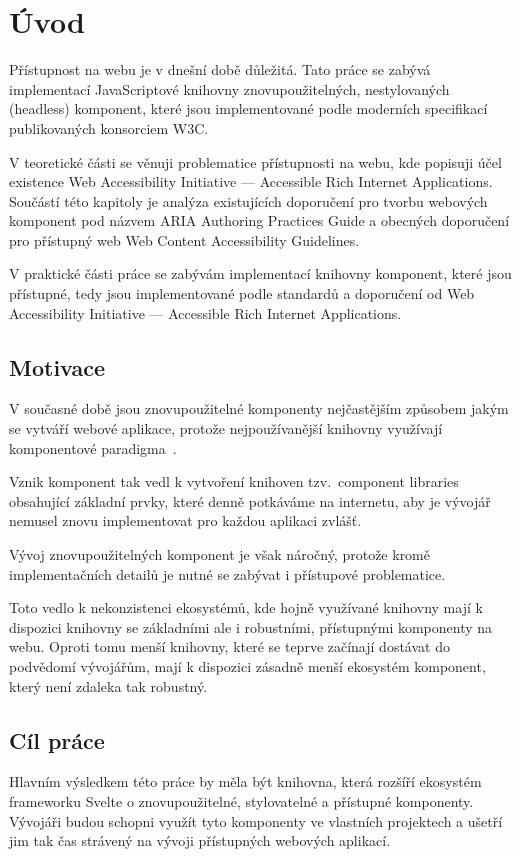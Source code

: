 \chapter{Úvod}

Přístupnost na webu je v dnešní době důležitá. Tato práce se zabývá implementací JavaScriptové knihovny
znovupoužitelných, nestylovaných (headless) komponent, které jsou implementované podle moderních specifikací publikovaných konsorciem W3C.

V teoretické části se věnuji problematice přístupnosti na webu, kde popisuji účel existence
Web Accessibility Initiative --- Accessible Rich Internet Applications.
Součástí této kapitoly je analýza existujících doporučení pro tvorbu webových
komponent pod názvem ARIA Authoring Practices Guide a
obecných doporučení pro přístupný web Web Content Accessibility Guidelines.

V praktické části práce se zabývám implementací knihovny komponent,
které jsou přístupné, tedy jsou implementované podle standardů a doporučení od Web Accessibility Initiative --- Accessible Rich Internet Applications.

\section{Motivace}

V současné době jsou znovupoužitelné komponenty nejčastějším způsobem jakým se vytváří webové aplikace, protože nejpoužívanější knihovny využívají komponentové paradigma~\cite{react,vue,solid,svelte}.

Vznik komponent tak vedl k vytvoření knihoven tzv.\ component libraries obsahující základní prvky, které denně potkáváme na internetu, aby je vývojář nemusel znovu implementovat pro každou aplikaci zvlášť.

Vývoj znovupoužitelných komponent je však náročný, protože kromě implementačních detailů je nutné se zabývat i přístupové problematice.

Toto vedlo k nekonzistenci ekosystémů, kde hojně využívané knihovny mají k dispozici knihovny se základními ale i robustními, přístupnými komponenty na webu. Oproti tomu menší knihovny, které se teprve začínají dostávat do podvědomí vývojářům, mají k dispozici zásadně menší ekosystém komponent, který není zdaleka tak robustný.

\section{Cíl práce}

Hlavním výsledkem této práce by měla být knihovna, která rozšíří ekosystém frameworku Svelte o znovupoužitelné, stylovatelné a přístupné komponenty.
Vývojáři budou schopni využít tyto komponenty ve vlastních projektech a ušetří jim tak čas strávený na vývoji přístupných webových aplikací.
